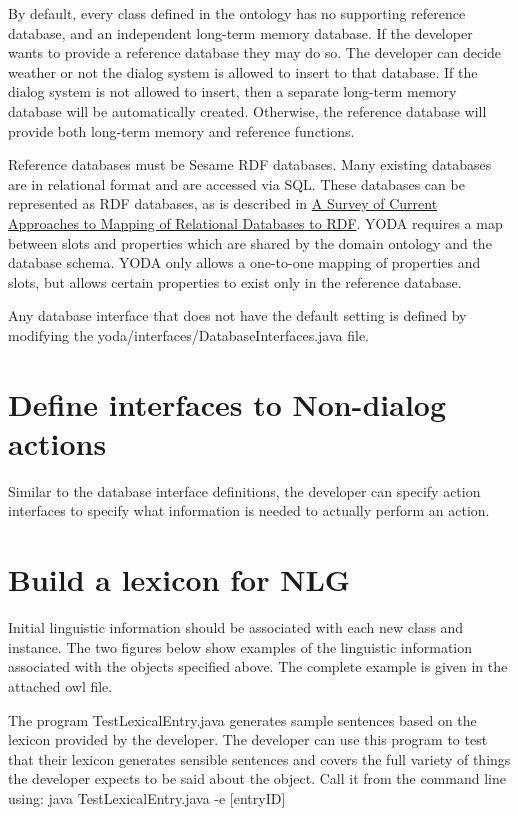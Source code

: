 \documentclass[10pt]{article}
\begin{document}
By default, every class defined in the ontology has no supporting reference database, and an independent long-term memory database.
If the developer wants to provide a reference database they may do so.
The developer can decide weather or not the dialog system is allowed to insert to that database.
If the dialog system is not allowed to insert, then a separate long-term memory database will be automatically created.
Otherwise, the reference database will provide both long-term memory and reference functions.

Reference databases must be Sesame RDF databases.
Many existing databases are in relational format and are accessed via SQL.
These databases can be represented as RDF databases, as is described in \href{http://www.w3.org/2005/Incubator/rdb2rdf/RDB2RDF_SurveyReport.pdf}{A Survey of Current Approaches to Mapping of Relational Databases to RDF}.
YODA requires a map between slots and properties which are shared by the domain ontology and the database schema.
YODA only allows a one-to-one mapping of properties and slots, but allows certain properties to exist only in the reference database.

Any database interface that does not have the default setting is defined by modifying the yoda/interfaces/DatabaseInterfaces.java file.




\section {Define interfaces to Non-dialog actions}
Similar to the database interface definitions, the developer can specify action interfaces to specify what information is needed to actually perform an action.

\section {Build a lexicon for NLG}
Initial linguistic information should be associated with each new class and instance.
The two figures below show examples of the linguistic information associated with the objects specified above.
The complete example is given in the attached owl file.

The program TestLexicalEntry.java generates sample sentences based on the lexicon provided by the developer.
The developer can use this program to test that their lexicon generates sensible sentences and covers the full variety of things the developer expects to be said about the object.
Call it from the command line using: java TestLexicalEntry.java -e [entryID]
\end{document}
